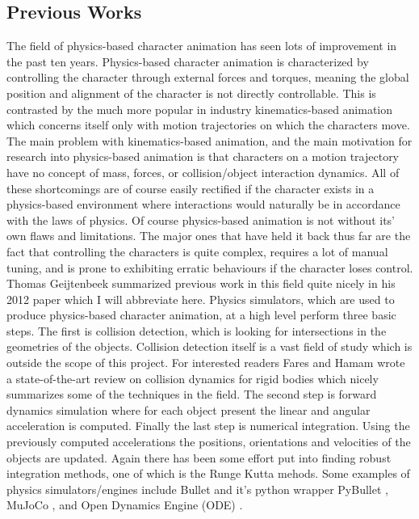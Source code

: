 \documentclass[12pt, a4paper]{article}
\begin{document}
\subsection{Previous Works}

The field of physics-based character animation has seen lots of improvement in the past ten years. Physics-based character animation is characterized by controlling the character through external forces and torques, meaning the global position and alignment of the character is not directly controllable. This is contrasted by the much more popular in industry kinematics-based animation which concerns itself only with motion trajectories on which the characters move. The main problem with kinematics-based animation, and the main motivation for research into physics-based animation is that characters on a motion trajectory have no concept of mass, forces, or collision/object interaction dynamics. All of these shortcomings are of course easily rectified if the character exists in a physics-based environment where interactions would naturally be in accordance with the laws of physics. Of course physics-based animation is not without its' own flaws and limitations. The major ones that have held it back thus far are the fact that controlling the characters is quite complex, requires a lot of manual tuning, and is prone to exhibiting erratic behaviours if the character loses control. \\

Thomas Geijtenbeek summarized previous work in this field quite nicely in his 2012 paper \cite{Geijtenbeek} which I will abbreviate here. Physics simulators, which are used to produce physics-based character animation, at a high level perform three basic steps. The first is collision detection, which is looking for intersections in the geometries of the objects. Collision detection itself is a vast field of study which is outside the scope of this project. For interested readers Fares and Hamam \cite{fares2005collision} 
wrote a state-of-the-art review on collision dynamics for rigid bodies which nicely summarizes some of the techniques in the field. The second step is forward dynamics simulation where for each object present the linear and angular acceleration is computed. Finally the last step is numerical integration. Using the previously computed accelerations the positions, orientations and velocities of the objects are updated. Again there has been some effort put into finding robust integration methods, one of which is the Runge Kutta mehods. Some examples of physics simulators/engines include Bullet and it's python wrapper PyBullet \cite{pybullet}, MuJoCo \cite{mujoco}, and Open Dynamics Engine (ODE) \cite{ode}.\\ 
\end{document}
